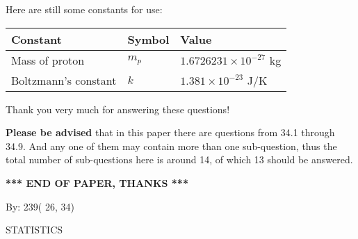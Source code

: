 \documentclass[12pt]{article}
\begin{document}
 
 
   
   
 \vspace{0.2in}
Here are still some constants for use:
 
 
\noindent\begin{tabular}{|l|l|l|}
\hline
Constant & Symbol & Value \\
\hline
 
Mass of proton &
$m_p$ &
 $ 1.6726231 \times 10^{-27} $
kg \\
\hline
 
Boltzmann's constant &
$k$ &
 $ 1.381 \times 10^{-23} $
J/K \\
\hline
 
\end{tabular}
 
Thank you very much for answering these questions!
 
{\textbf{\large{Please be advised}}} that in this paper there are questions from
34.1 through
34.9.
And any one of them may contain more than one sub-question, thus the total number
of sub-questions here is around 14, of which
13 should be answered.
 
   
   
   
   
\vspace{1.0in} 
{\textbf{\large{ *** END OF PAPER, THANKS *** }}} 
   
   
\hspace{1.0in} By: 
         239(         26,          34)
   
   
   
\vspace{0.2in}
\vspace{0.2in}
   
   
 \newpage
\setcounter{page}{1} 
   
   
 {\LARGE{STATISTICS}}
   
\vspace{0.2in}
   
\end{document}
